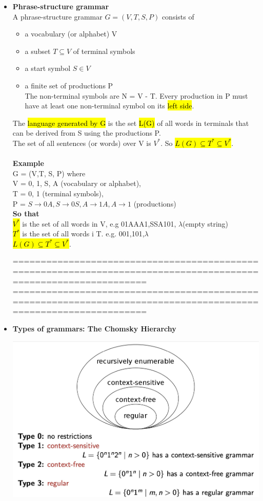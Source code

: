 \documentclass{article}
\begin{document}
\begin{itemize}
\item \textbf{Phrase-structure grammar}\\
A phrase-structure grammar $G = (V,T, S, P)$ consists of
\begin{itemize}
\item a vocabulary (or alphabet) V
\item a subset $T \subseteq V$ of terminal symbols
\item a start symbol $S \in V $
\item a finite set of productions P\\
The non-terminal symbols are N = V - T. Every production in P must
have at least one non-terminal symbol on its \hl{left side}.
\end{itemize}
The \hl{language generated by G} is the set \hl{L(G)} of all words in terminals that
can be derived from S using the productions P.\\
The set of all sentences (or words) over V is $V^*$.
So \hl{$L(G) \subseteq T^* \subseteq V^*$}.\\\\
\textbf{Example}\\
G = (V,T, S, P) where\\
V = {0, 1, S, A} (vocabulary or alphabet),\\
T = {0, 1} (terminal symbols),\\
P = {$S \rightarrow 0A, S \rightarrow 0S, A \rightarrow 1A, A \rightarrow 1$} (productions)\\
\textbf{So that}\\
\hl{$V^*$} is the set of all words in V, e.g 01AAA1,SSA101, $\lambda$(empty string)\\
\hl{$T^*$} is the set of all words i T. e.g. 001,101,$\lambda$\\
\hl{$L(G) \subseteq T^* \subseteq V^*$}.


================================================================================================================
\newpage
================================================================================================================\\


\item \textbf{Types of grammars: The Chomsky Hierarchy}\\

\begin{center}
\includegraphics[width=0.6\linewidth]{graph/32.jpg} \\%
\end{center}


\end{itemize}
\end{document}
